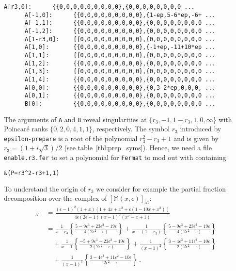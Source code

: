 \documentclass[12pt]{article}
\numberwithin{equation}{section}
\numberwithin{figure}{section}
\newcommand{\M}{\mathds{M}}
\begin{document}
    \begin{lstlisting}[basicstyle=\ttfamily,xleftmargin=-2em]
      A[r3,0]:  	{{0,0,0,0,0,0,0,0,0},{0,0,0,0,0,0,0,0 ...
      A[-1,0]:  	{{0,0,0,0,0,0,0,0,0},{1-ep,5-6*ep,-6+ ...
      A[-1,1]:  	{{0,0,0,0,0,0,0,0,0},{0,0,0,0,0,0,0,0 ...
      A[-1,2]:  	{{0,0,0,0,0,0,0,0,0},{0,0,0,0,0,0,0,0 ...
      A[1-r3,0]:	{{0,0,0,0,0,0,0,0,0},{0,0,0,0,0,0,0,0 ...
      A[1,0]:   	{{0,0,0,0,0,0,0,0,0},{-1+ep,-11+10*ep ...
      A[1,1]:   	{{0,0,0,0,0,0,0,0,0},{0,0,0,0,0,0,0,0 ...
      A[1,2]:   	{{0,0,0,0,0,0,0,0,0},{0,0,0,0,0,0,0,0 ...
      A[1,3]:   	{{0,0,0,0,0,0,0,0,0},{0,0,0,0,0,0,0,0 ...
      A[1,4]:   	{{0,0,0,0,0,0,0,0,0},{0,0,0,0,0,0,0,0 ...
      A[0,0]:   	{{0,0,0,0,0,0,0,0,0},{0,3-2*ep,0,0,0, ...
      A[0,1]:   	{{0,0,0,0,0,0,0,0,0},{0,0,0,0,0,0,0,0 ...
      B[0]:     	{{0,0,0,0,0,0,0,0,0},{0,0,0,0,0,0,0,0 ...
    \end{lstlisting}      
    The arguments of \texttt{A} and \texttt{B} reveal singularities at $\{r_3,-1,1-r_3,1,0,\infty\}$ with Poincar\'{e} ranks $\{0,2,0,4,1,1\}$, respectively.
    The symbol $r_3$ introduced by \texttt{epsilon-prepare} is a root of the polynomial $r_3^2 - r_3 + 1$ and is given by $r_3 = (1+i\sqrt3)/2$ (see table~\ref{tbl:prep_syms}).
    Hence, we need a file \texttt{enable.r3.fer} to set a polynomial for \texttt{Fermat} to mod out with containing
    \begin{lstlisting}[basicstyle=\ttfamily,xleftmargin=-2em]
      &(P=r3^2-r3+1,1)
    \end{lstlisting}      
    To understand the origin of $r_3$ we consider for example the partial fraction decomposition over the complex of $[\M(x,\epsilon)]_{51}$:
    \begin{align*}
      [\M(x,\epsilon)]_{51}
      &= 
      \frac{(\epsilon-1)^2(1+x)\left(1+4x+x^2+\epsilon\left(1-10x+x^2\right)\right)}{4\epsilon(2\epsilon-1)(x-1)^3\left(x^2-x+1\right)} \\
      &= 
        \frac1{x-r_3} \left\{
          \frac{5-9\epsilon^3+23\epsilon^2-19\epsilon}{4(2\epsilon^2-\epsilon)}
        \right\}
        +
        \frac1{x-(1-r_3)} \left\{
          \frac{5-9\epsilon^3+23\epsilon^2-19\epsilon}{4(2\epsilon^2-\epsilon)}
        \right\} \\ &\quad
        +
        \frac1{x-1} \left\{
          \frac{-5+9\epsilon^3-23\epsilon^2+19\epsilon}{2(2\epsilon^2-\epsilon)}
        \right\}
        +
        \frac1{(x-1)^2} \left\{
           \frac{3-4\epsilon^3+11\epsilon^2-10\epsilon}{2(2\epsilon^2-\epsilon)}
        \right\} \\ &\quad
        + 
        \frac1{(x-1)^3} \left\{
          \frac{3-4\epsilon^3+11\epsilon^2-10\epsilon}{2\epsilon^2-\epsilon}
        \right\}\,.
    \end{align*}
\end{document}
